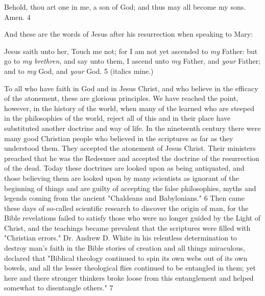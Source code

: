Behold, thou art one in me, a son of God; and thus may all become my sons. Amen. 4

And these are the words of Jesus after his resurrection when speaking to Mary:

Jesus saith unto her, Touch me not; for I am not yet ascended to \textit{my} Father: but go to \textit{my
brethren}, and say unto them, I ascend unto \textit{my} Father, and \textit{your} Father; and to \textit{my} God, and
\textit{your} God. 5 (italics mine.)

To all who have faith in God and in Jesus Christ, and who believe in the efficacy of the
atonement, these are glorious principles. We have reached the point, however, in the history
of the world, when many of the learned who are steeped in the philosophies of the world,
reject all of this and in their place have substituted another doctrine and way of life. In the
nineteenth century there were many good Christian people who believed in the scriptures as
far as they understood them. They accepted the atonement of Jesus Christ. Their ministers
preached that he was the Redeemer and accepted the doctrine of the resurrection of the dead.
Today these doctrines are looked upon as being antiquated, and those believing them are
looked upon by many scientists as ignorant of the beginning of things and are guilty of
accepting the false philosophies, myths and legends coming from the ancient "Chaldeans and
Babylonians." 6 Then came these days of so-called scientific research to discover the origin
of man, for the Bible revelations failed to satisfy those who were no longer guided by the
Light of Christ, and the teachings became prevalent that the scriptures were filled with
"Christian errors." Dr. Andrew D. White in his relentless determination to destroy man's faith
in the Bible stories of creation and all things miraculous, declared that "Biblical theology
continued to spin its own webs out of its own bowels, and all the lesser theological flies
continued to be entangled in them; yet here and there stronger thinkers broke loose from this
entanglement and helped somewhat to disentangle others." 7

